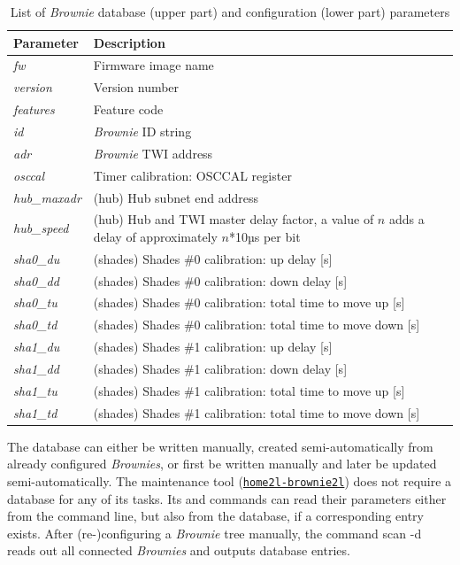 \documentclass[12pt,english,parskip=half,headheight=19pt]{scrreprt}
\newcommand{\lst}[1]{\colorbox{lstbackground}{\footnotesize\code{#1}}}
\newcommand{\lstf}[1]{\colorbox{lstbackground}{\ttfamily\footnotesize#1}}
\newcommand{\idx}[1]{#1\index{#1}}
\newcommand{\reftool}[1]{\hyperref[tool:#1]{\texttt{\idx{#1}}}}
\begin{document}
\begin{table}[ht]
  \centering
  \renewcommand{\arraystretch}{1.4}
  \begin{tabular}{l|p{12cm}}
    Parameter & Description \\
    \hline \hline
    \textit{fw}         & Firmware image name \\
    \textit{version}    & Version number \\
    \textit{features}   & Feature code \\
    \hline
    \textit{id}         & \textit{Brownie} ID string \\
    \textit{adr}        & \textit{Brownie} TWI address \\

    \textit{osccal}     & Timer calibration: OSCCAL register \\

    \textit{hub\_maxadr} & (hub) Hub subnet end address \\
    \textit{hub\_speed} & (hub) Hub and TWI master delay factor, a value of $n$ adds a delay of approximately $n$*10µs per bit \\

    \textit{sha0\_du}   & (shades) Shades \#0 calibration: up delay [s] \\
    \textit{sha0\_dd}   & (shades) Shades \#0 calibration: down delay [s] \\
    \textit{sha0\_tu}   & (shades) Shades \#0 calibration: total time to move up [s] \\
    \textit{sha0\_td}   & (shades) Shades \#0 calibration: total time to move down [s] \\
    \textit{sha1\_du}   & (shades) Shades \#1 calibration: up delay [s] \\
    \textit{sha1\_dd}   & (shades) Shades \#1 calibration: down delay [s] \\
    \textit{sha1\_tu}   & (shades) Shades \#1 calibration: total time to move up [s] \\
    \textit{sha1\_td}   & (shades) Shades \#1 calibration: total time to move down [s] \\
  \end{tabular}
  \caption[l]{List of \textit{Brownie} database (upper part) and configuration (lower part) parameters}
  \label{tab:brownies-config}
\end{table}

The database can either be written manually, created semi-automatically from already configured \textit{Brownies}, or first be written manually and later be updated semi-automatically. The maintenance tool (\reftool{home2l-brownie2l}) does not require a database for any of its tasks. Its \lst{config} and \lst{program} commands can read their parameters either from the command line, but also from the database, if a corresponding entry exists. After (re-)configuring a \textit{Brownie} tree manually, the command \lstf{scan -d} reads out all connected \textit{Brownies} and outputs database entries.
\end{document}
